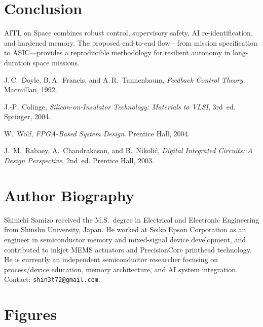 \documentclass[conference]{IEEEtran}
\begin{document}
\section{Conclusion}
AITL on Space combines robust control, supervisory safety, AI re-identification, and hardened memory. The proposed end-to-end flow—from mission specification to ASIC—provides a reproducible methodology for resilient autonomy in long-duration space missions.

\begin{thebibliography}{99}
J.\,C.~Doyle, B.\,A.~Francis, and A.\,R.~Tannenbaum,
\emph{Feedback Control Theory}. Macmillan, 1992.

J.-P.~Colinge, \emph{Silicon-on-Insulator Technology: Materials to VLSI}, 3rd~ed. Springer, 2004.

W.~Wolf, \emph{FPGA-Based System Design}. Prentice Hall, 2004.

J.~M.~Rabaey, A.~Chandrakasan, and B.~Nikoli\'c,
\emph{Digital Integrated Circuits: A Design Perspective}, 2nd~ed. Prentice Hall, 2003.
\end{thebibliography}

\section*{Author Biography}
Shinichi Samizo received the M.S.\ degree in Electrical and Electronic Engineering from Shinshu University, Japan. He worked at Seiko Epson Corporation as an engineer in semiconductor memory and mixed-signal device development, and contributed to inkjet MEMS actuators and PrecisionCore printhead technology. He is currently an independent semiconductor researcher focusing on process/device education, memory architecture, and AI system integration. Contact: \texttt{shin3t72@gmail.com}.


\section*{Figures}
\end{document}
